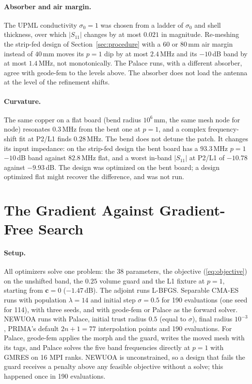 \documentclass{anvil-paper}
\newcommand{\PL}{P2/L1}
\begin{document}
\paragraph{Absorber and air margin.}
The UPML conductivity $\sigma_0 = 1$ was chosen from a ladder of $\sigma_0$
and shell thickness, over which $|S_{11}|$ changes by at most $0.021$ in
magnitude. Re-meshing the strip-fed design of Section~\ref{sec:procedure}
with a $60$ or $80$\,mm air margin instead of $40$\,mm moves its $p = 1$ dip
by at most $2.4$\,MHz and its $-10$\,dB band by at most $1.4$\,MHz, not
monotonically. The Palace runs, with a different absorber, agree with
geode-fem to the levels above. The absorber does not load the antenna at
the level of the refinement shifts.

\paragraph{Curvature.}
The same copper on a flat board (bend radius $10^6$\,mm, the same mesh node
for node) resonates $0.3$\,MHz from the bent one at $p = 1$, and a complex
frequency-shift fit at \PL{} finds $0.28$\,MHz. The bend does not detune the
patch. It changes its input impedance: on the strip-fed design the bent
board has a $93.3$\,MHz $p = 1$ $-10$\,dB band against $82.8$\,MHz flat, and
a worst in-band $|S_{11}|$ at \PL{} of $-10.78$ against $-9.93$\,dB. The
design was optimized on the bent board; a design optimized flat might
recover the difference, and was not run.

\section{The Gradient Against Gradient-Free Search}
\label{sec:baselines}

\paragraph{Setup.}
All optimizers solve one problem: the 38 parameters, the objective
(\ref{eq:objective}) on the unshifted band, the $0.25$ volume guard and the
L1 fixture at $p = 1$, starting from $\mathbf{c} = 0$ ($-1.47$\,dB). The
adjoint runs L-BFGS. Separable CMA-ES runs with population $\lambda = 14$
and initial step $\sigma = 0.5$ for 190 evaluations (one seed for 114), with
three seeds, and with geode-fem or Palace as the forward solver. NEWUOA runs
with Palace, initial trust radius $0.5$ (equal to $\sigma$), final radius
$10^{-3}$, PRIMA's default $2n + 1 = 77$ interpolation points and 190
evaluations. For Palace, geode-fem applies the morph and the guard, writes
the moved mesh with its tags, and Palace solves the five band frequencies
directly at $p = 1$ with GMRES on 16 MPI ranks. NEWUOA is unconstrained, so a
design that fails the guard receives a penalty above any feasible
objective without a solve; this happened once in 190 evaluations.
\end{document}
